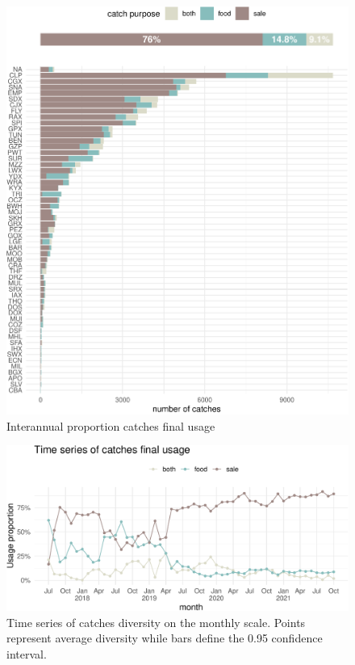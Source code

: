 \documentclass[
]{article}
\begin{document}
\begin{figure}
\centering
\includegraphics{data_report_files/figure-latex/unnamed-chunk-5-1.pdf}
\caption{\label{fig:unnamed-chunk-5}Interannual proportion catches final usage}
\end{figure}

\begin{figure}
\centering
\includegraphics{data_report_files/figure-latex/unnamed-chunk-6-1.pdf}
\caption{\label{fig:unnamed-chunk-6}Time series of catches diversity on the monthly scale. Points represent average diversity while bars define the 0.95 confidence interval.}
\end{figure}
\end{document}
